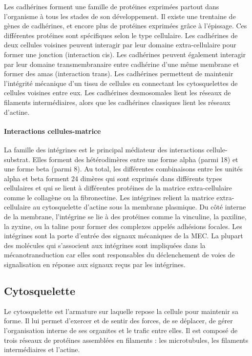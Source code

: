 Les cadhérines forment une famille de protéines exprimées partout dans l'organisme à tous les stades de son développement. 
Il existe une trentaine de gènes de cadhérines, et encore plus de protéines exprimées grâce à l'épissage. Ces différentes protéines sont spécifiques selon le type cellulaire.
Les cadhérines de deux cellules voisines peuvent interagir par leur domaine extra-cellulaire pour former une jonction (interaction cis). Les cadhérines peuvent également interagir par leur domaine transmembranaire entre cadhérine d'une même membrane et former des amas (interaction trans). 
Les cadhérines permettent de maintenir l'intégrité mécanique d'un tissu de cellules en connectant les cytosquelettes de cellules voisines entre eux. Les cadhérines desmosomales lient les réseaux de filaments intermédiaires, alors que les cadhérines classiques lient les réseaux d'actine. 


\paragraph{Interactions cellules-matrice}

La famille des intégrines est le principal médiateur des interactions cellule-substrat. Elles forment des hétérodimères entre une forme alpha (parmi 18) et une forme beta (parmi 8). Au total, les différentes combinaisons entre les unités alpha et beta forment 24 dimères qui sont exprimés dans différents types cellulaires et qui se lient à différentes protéines de la matrice extra-cellulaire comme le collagène ou la fibronectine. 
Les intégrines relient la matrice extra-cellulaire au cytosquelette d'actine sous la membrane plasmique. Du côté interne de la membrane, l'intégrine se lie à des protéines comme la vinculine, la paxiline, la zyxine, ou la taline pour former des complexes appelés adhésions focales. 
Les intégrines sont la porte d'entrée des signaux mécaniques de la MEC. La plupart des molécules qui s'associent aux intégrines sont impliquées dans la mécanotransduction car elles sont responsables du déclenchement de voies de signalisation en réponse aux signaux reçus par les intégrines. 

\subsection{Cytosquelette}

Le cytosquelette est l'armature sur laquelle repose la cellule pour maintenir sa forme. Il lui permet d'exercer et de sentir des forces, de se déplacer, de gérer l'organisation interne de ses organites et le trafic entre elles. Il est composé de trois réseaux de protéines assemblées en filaments : les microtubules, les filaments intermédiaires et l'actine. 


